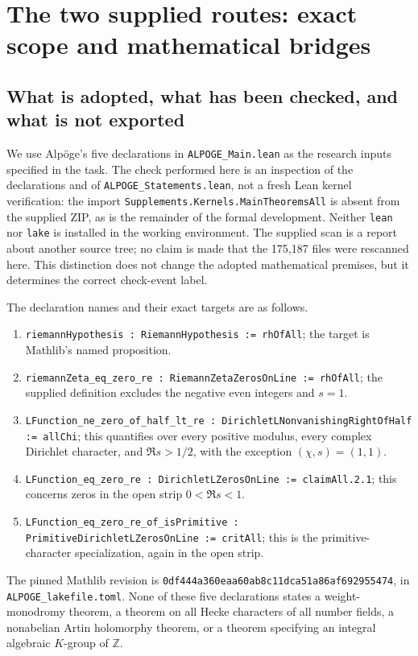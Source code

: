 \section{The two supplied routes: exact scope and mathematical bridges}
\label{sec:source-masullo}

\subsection{What is adopted, what has been checked, and what is not exported}

We use Alp\"oge's five declarations in \texttt{ALPOGE\_Main.lean} as the research
inputs specified in the task.  The check performed here is an inspection of the
declarations and of \texttt{ALPOGE\_Statements.lean}, not a fresh Lean kernel
verification: the import \texttt{Supplements.Kernels.MainTheoremsAll} is absent
from the supplied ZIP, as is the remainder of the formal development.  Neither
\texttt{lean} nor \texttt{lake} is installed in the working environment.  The
supplied scan is a report about another source tree; no claim is made that the
175,187 files were rescanned here.  This distinction does not change the adopted
mathematical premises, but it determines the correct check-event label.

The declaration names and their exact targets are as follows.
\begin{enumerate}
\item \texttt{riemannHypothesis : RiemannHypothesis := rhOfAll}; the target is
Mathlib's named proposition.
\item \texttt{riemannZeta\_eq\_zero\_re : RiemannZetaZerosOnLine := rhOfAll};
the supplied definition excludes the negative even integers and $s=1$.
\item \texttt{LFunction\_ne\_zero\_of\_half\_lt\_re :
DirichletLNonvanishingRightOfHalf := allChi}; this quantifies over every positive
modulus, every complex Dirichlet character, and $\Re s>1/2$, with the exception
$(\chi,s)=(1,1)$.
\item \texttt{LFunction\_eq\_zero\_re : DirichletLZerosOnLine := claimAll.2.1};
this concerns zeros in the open strip $0<\Re s<1$.
\item \texttt{LFunction\_eq\_zero\_re\_of\_isPrimitive :
PrimitiveDirichletLZerosOnLine := critAll}; this is the primitive-character
specialization, again in the open strip.
\end{enumerate}
The pinned Mathlib revision is
\texttt{0df444a360eaa60ab8c11dca51a86af692955474}, in
\texttt{ALPOGE\_lakefile.toml}.  None of these five declarations states a
weight-monodromy theorem, a theorem on all Hecke characters of all number
fields, a nonabelian Artin holomorphy theorem, or a theorem specifying an
integral algebraic $K$-group of $\mathbb Z$.


